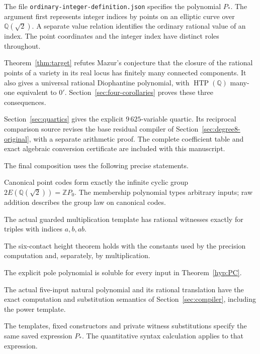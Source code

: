 \documentclass[11pt]{article}
\theoremstyle{definition}
\theoremstyle{remark}
\newcommand{\Q}{\mathbb Q}
\newcommand{\Z}{\mathbb Z}
\begin{document}
The file \nolinkurl{ordinary-integer-definition.json} specifies the
polynomial $P_*$. The argument first represents integer indices by points
on an elliptic curve over $\Q(\sqrt2)$. A separate value relation identifies
the ordinary rational value of an index. The point coordinates and the
integer index have distinct roles throughout.

Theorem~\ref{thm:target} refutes Mazur's conjecture that the closure of
the rational points of a variety in its real locus has finitely many
connected components. It also gives a universal rational Diophantine
polynomial, with
$\operatorname{HTP}(\Q)$ many-one equivalent to $0'$.
Section~\ref{sec:four-corollaries} proves these three consequences.

Section~\ref{sec:quartics} gives the explicit $9\,625$-variable quartic.
Its reciprocal comparison source revises the base residual compiler of
Section~\ref{sec:degree8-original}, with a separate arithmetic proof.
The complete coefficient table and exact algebraic conversion certificate
are included with this manuscript.

The final composition uses the following precise statements.
\begin{description}[style=nextline,leftmargin=1.8cm]
\item[$\mathsf G$] Canonical point codes form exactly the infinite cyclic
group $2E(\Q(\sqrt2))=\Z P_0$. The membership polynomial types arbitrary inputs;
raw addition describes the group law on canonical codes.
\item[$\mathsf M$] The actual guarded multiplication template has rational
witnesses exactly for triples with indices $a,b,ab$.
\item[$\mathsf H$] The six-contact height theorem holds with the constants
used by the precision computation and, separately, by multiplication.
\item[$\mathsf{PC}$] The explicit pole polynomial is soluble for every
input in Theorem~\ref{hyp:PC}.
\item[$\mathsf C$] The actual five-input natural polynomial and its
rational translation have the exact computation and substitution semantics
of Section~\ref{sec:compiler}, including the power template.
\item[$\mathsf B$] The templates, fixed constructors and private witness
substitutions specify the same saved expression $P_*$. The quantitative
syntax calculation applies to that expression.
\end{description}
\end{document}

